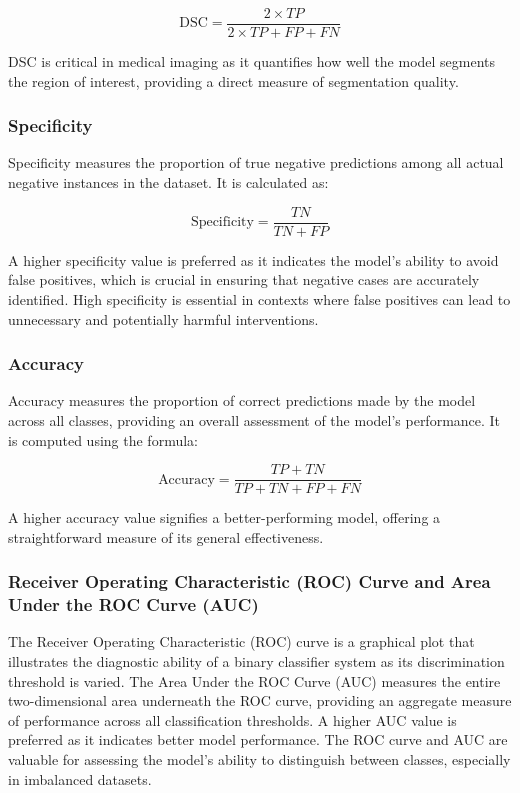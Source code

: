 \[
\text{DSC} = \frac{2 \times TP}{2 \times TP + FP + FN}
\]

DSC is critical in medical imaging as it quantifies how well the model segments the region of interest, providing a direct measure of segmentation quality.

\subsubsection{Specificity}

Specificity measures the proportion of true negative predictions among all actual negative instances in the dataset. It is calculated as:

\[
\text{Specificity} = \frac{TN}{TN + FP}
\]

A higher specificity value is preferred as it indicates the model's ability to avoid false positives, which is crucial in ensuring that negative cases are accurately identified. High specificity is essential in contexts where false positives can lead to unnecessary and potentially harmful interventions.

\subsubsection{Accuracy}

Accuracy measures the proportion of correct predictions made by the model across all classes, providing an overall assessment of the model's performance. It is computed using the formula:

\[
\text{Accuracy} = \frac{TP + TN}{TP + TN + FP + FN}
\]

A higher accuracy value signifies a better-performing model, offering a straightforward measure of its general effectiveness.

\subsubsection{Receiver Operating Characteristic (ROC) Curve and Area Under the ROC Curve (AUC)}

The Receiver Operating Characteristic (ROC) curve is a graphical plot that illustrates the diagnostic ability of a binary classifier system as its discrimination threshold is varied. The Area Under the ROC Curve (AUC) measures the entire two-dimensional area underneath the ROC curve, providing an aggregate measure of performance across all classification thresholds. A higher AUC value is preferred as it indicates better model performance. The ROC curve and AUC are valuable for assessing the model's ability to distinguish between classes, especially in imbalanced datasets.

